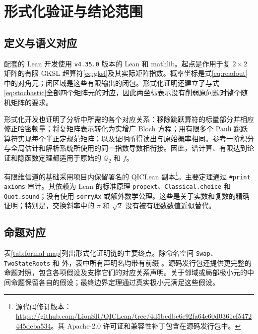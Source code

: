 \documentclass[UTF8,11pt,a4paper,fontset=fandol]{ctexart}
\theoremstyle{definition}
\theoremstyle{remark}
\newcommand{\Q}{\mathcal Q_2}
\begin{document}
\section{形式化验证与结论范围}\label{sec:formal}

\subsection{定义与语义对应}
配套的 Lean 开发使用 \texttt{v4.35.0} 版本的 Lean 和 mathlib。起点是作用于复 \(2\times2\) 矩阵的有限 GKSL 超算符\eqref{eq:gksl}及其实际矩阵指数。概率坐标是式\eqref{eq:readout}中的对角元；闭区域是这些有限输出的闭包。形式化证明还建立了与式\eqref{eq:stochastic}全部四个矩阵元的对应，因此两坐标表示没有削弱原问题对整个随机矩阵的要求。

形式化开发也证明了分析中所需的各个对应关系：移除跳跃算符的标量部分并相应修正哈密顿量；将复矩阵表示转化为实增广 Bloch 方程；用有限多个 Pauli 跳跃算符实现每个半正定规范矩阵；以及证明所得读出与原始概率相同。参考一阶积分与全局估计和解析系统所使用的同一指数导数相衔接。因此，谱计算、有限达到论证和隐函数定理都适用于原始的 \(\Q\) 和 \(f\)。

有限维信道的基础采用项目内保留署名的 QICLean 副本\footnote{源代码修订版本：\url{https://github.com/LionSR/QICLean/tree/4d5bcdbe6e92fa64c60d0361cf5472445deba534}。其 Apache-2.0 许可证和兼容性补丁包含在源码发行包中。}。主要定理通过 \texttt{\#print axioms} 审计。其依赖为 Lean 的标准原理 \texttt{propext}、\texttt{Classical.choice} 和 \texttt{Quot.sound}；没有使用 \texttt{sorryAx} 或额外数学公理。这些是关于实数和复数的精确证明；特别是，交换斜率中的 \(\pi\) 和 \(\sqrt2\) 没有被有理数数值近似替代。

\subsection{命题对应}
表\ref{tab:formal-map}列出形式化证明链的主要终点。除命名空间 \texttt{Swap}、\texttt{TwoStateRoots} 和  外，表中所有声明名均带有前缀 。源码发行包还提供更完整的命题对照，包含各项假设及支撑它们的对应关系声明。关于邻域或局部极小元的中间命题保留各自的假设；最终边界定理通过真实极小元满足这些假设。
\end{document}
